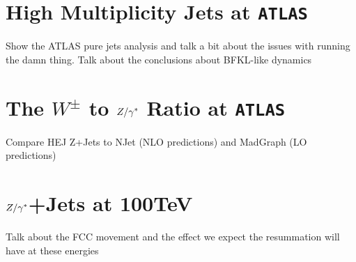 \chapter{High Multiplicity Jets at \texttt{ATLAS}}
\label{chap:ATLAS}

Show the ATLAS pure jets analysis and talk a bit about the issues with running the damn thing.  Talk about the conclusions about BFKL-like dynamics

\chapter{The $W^\pm$ to ${Z/\gamma^*}$ Ratio at \texttt{ATLAS}}
\label{chap:WZRatio}

Compare HEJ Z+Jets to NJet (NLO predictions) and MadGraph (LO predictions)

\chapter{${Z/\gamma^*}$+Jets at 100TeV}
\label{chap:100TeV}

Talk about the FCC movement and the effect we expect the resummation will have at these energies

